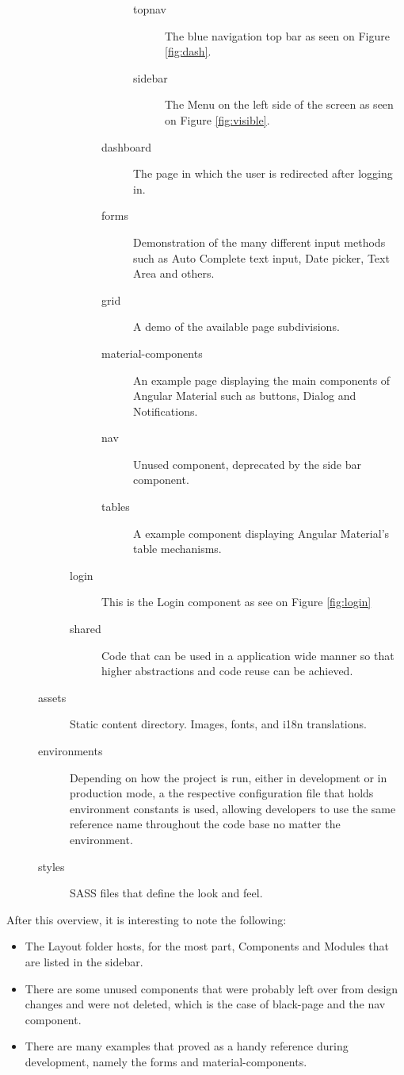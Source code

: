 \begin{description}
\begin{description}
\begin{description}
\begin{description}
\begin{description}
        \item[topnav] The blue navigation top bar as seen on Figure \ref{fig:dash}.
        \item[sidebar] The Menu on the left side of the screen as seen on Figure \ref{fig:visible}.
        \end{description}
      \item[dashboard] The page in which the user is redirected after logging in.
      \item[forms] Demonstration of the many different input methods such as Auto Complete text input, Date picker, Text Area and others.
      \item[grid] A demo of the available page subdivisions.
      \item[material-components] An example page displaying the main components of Angular Material such as buttons, Dialog and Notifications.
      \item[nav] Unused component, deprecated by the side bar component.
      \item[tables] A example component displaying Angular Material's table mechanisms.
      \end{description}

    \item[login] This is the Login component as see on Figure \ref{fig:login}
    \item[shared] Code that can be used in a application wide manner so that higher abstractions and code reuse can be achieved.
    \end{description}
  \item[assets] Static content directory. Images, fonts, and i18n translations.
  \item[environments] Depending on how the project is run, either in development or in production mode, a the respective configuration file that holds environment constants is used, allowing developers to use the same reference name throughout the code base no matter the environment.
  \item[styles] \gls{SASS} files that define the look and feel.
  \end{description}
\end{description}

After this overview, it is interesting to note the following:
\begin{itemize}
\item The Layout folder hosts, for the most part, Components and Modules that are listed in the sidebar.\item There are some unused components that were probably left over from design changes and were not deleted, which is the case of black-page and the nav component.
\item There are many examples that proved as a handy reference during development, namely the forms and material-components.
\end{itemize}


